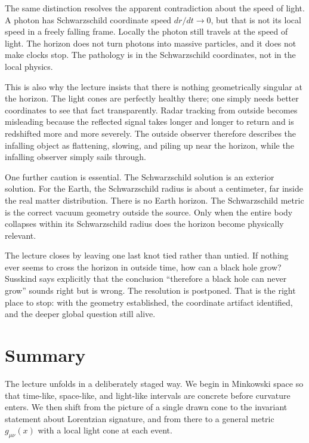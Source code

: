 The same distinction resolves the apparent contradiction about the speed of light. A photon has Schwarzschild coordinate speed \(dr/dt\to 0\), but that is not its local speed in a freely falling frame. Locally the photon still travels at the speed of light. The horizon does not turn photons into massive particles, and it does not make clocks stop. The pathology is in the Schwarzschild coordinates, not in the local physics.

This is also why the lecture insists that there is nothing geometrically singular at the horizon. The light cones are perfectly healthy there; one simply needs better coordinates to see that fact transparently. Radar tracking from outside becomes misleading because the reflected signal takes longer and longer to return and is redshifted more and more severely. The outside observer therefore describes the infalling object as flattening, slowing, and piling up near the horizon, while the infalling observer simply sails through.

One further caution is essential. The Schwarzschild solution is an exterior solution. For the Earth, the Schwarzschild radius is about a centimeter, far inside the real matter distribution. There is no Earth horizon. The Schwarzschild metric is the correct vacuum geometry outside the source. Only when the entire body collapses within its Schwarzschild radius does the horizon become physically relevant.

The lecture closes by leaving one last knot tied rather than untied. If nothing ever seems to cross the horizon in outside time, how can a black hole grow? Susskind says explicitly that the conclusion ``therefore a black hole can never grow'' sounds right but is wrong. The resolution is postponed. That is the right place to stop: with the geometry established, the coordinate artifact identified, and the deeper global question still alive.

\section{Summary}

The lecture unfolds in a deliberately staged way. We begin in Minkowski space so that time-like, space-like, and light-like intervals are concrete before curvature enters. We then shift from the picture of a single drawn cone to the invariant statement about Lorentzian signature, and from there to a general metric \(g_{\mu\nu}(x)\) with a local light cone at each event.

